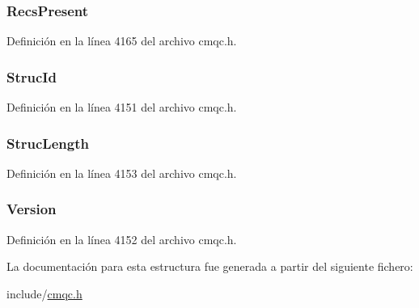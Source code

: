 \subsubsection[{Recs\+Present}]{ Recs\+Present}\label{structtag_m_q_d_h_a7592da03e0f1c9bc79c9dd4e641dcf73}


Definición en la línea 4165 del archivo cmqc.\+h.

\hypertarget{structtag_m_q_d_h_a0530922ca944569b52601d74941f96e4}{}
\subsubsection[{Struc\+Id}]{ Struc\+Id}\label{structtag_m_q_d_h_a0530922ca944569b52601d74941f96e4}


Definición en la línea 4151 del archivo cmqc.\+h.

\hypertarget{structtag_m_q_d_h_a830af9a4a08c015b9a4b2d39d4d3420a}{}
\subsubsection[{Struc\+Length}]{ Struc\+Length}\label{structtag_m_q_d_h_a830af9a4a08c015b9a4b2d39d4d3420a}


Definición en la línea 4153 del archivo cmqc.\+h.

\hypertarget{structtag_m_q_d_h_a0656ef8f766b3907d394d88a35d7b7e9}{}
\subsubsection[{Version}]{ Version}\label{structtag_m_q_d_h_a0656ef8f766b3907d394d88a35d7b7e9}


Definición en la línea 4152 del archivo cmqc.\+h.



La documentación para esta estructura fue generada a partir del siguiente fichero\+:\begin{DoxyCompactItemize}
\item 
include/\hyperlink{cmqc_8h}{cmqc.\+h}\end{DoxyCompactItemize}

